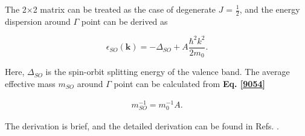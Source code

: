 \documentclass[a4paper, 12pt, titlepage,oneside,drop]{kthesis}
\begin{document}
The 2$\times$2 matrix can be treated as the case of degenerate $J$ = $\frac{1}{2}$, and the energy dispersion around $\Gamma$ point can be derived as

\begin{equation}\label{9054}
 \epsilon_{SO} (\textbf{k}) = -\varDelta_{SO} + A \frac{\hbar^2 {k}^2}{2m_0}.
\end{equation}

Here, $\varDelta_{SO}$ is the spin-orbit splitting energy of the valence band. The average effective mass $m_{SO}$ around $\Gamma$ point can be calculated from  \textbf{Eq. \ref{9054}} 

\begin{equation}\begin{split}
m_{SO}^{-1} = {m_0^{-1}}A.
 \end{split}
\end{equation}


 The derivation is brief, and the detailed derivation can be found in Refs. \cite{fospamp2010, suzuki1995first, dresselhaus1955cyclotron, persson1997relativistic}.
\end{document}
